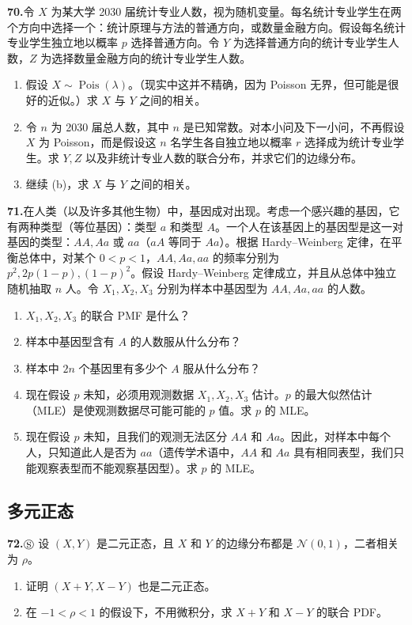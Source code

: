 \documentclass[UTF8, 12pt, fontset=fandol, oneside]{ctexart}
\begin{document}
\noindent\textbf{70.}\quad 令 $X$ 为某大学 2030 届统计专业人数，视为随机变量。每名统计专业学生在两个方向中选择一个：统计原理与方法的普通方向，或数量金融方向。假设每名统计专业学生独立地以概率 $p$ 选择普通方向。令 $Y$ 为选择普通方向的统计专业学生人数，$Z$ 为选择数量金融方向的统计专业学生人数。
\begin{enumerate}
  \item[(a)] 假设 $X\sim \operatorname{Pois}(\lambda)$。（现实中这并不精确，因为 Poisson 无界，但可能是很好的近似。）求 $X$ 与 $Y$ 之间的相关。
  \item[(b)] 令 $n$ 为 2030 届总人数，其中 $n$ 是已知常数。对本小问及下一小问，不再假设 $X$ 为 Poisson，而是假设这 $n$ 名学生各自独立地以概率 $r$ 选择成为统计专业学生。求 $Y,Z$ 以及非统计专业人数的联合分布，并求它们的边缘分布。
  \item[(c)] 继续 (b)，求 $X$ 与 $Y$ 之间的相关。
\end{enumerate}

\noindent\textbf{71.}\quad 在人类（以及许多其他生物）中，基因成对出现。考虑一个感兴趣的基因，它有两种类型（等位基因）：类型 $a$ 和类型 $A$。一个人在该基因上的基因型是这一对基因的类型：$AA,Aa$ 或 $aa$（$aA$ 等同于 $Aa$）。根据 Hardy--Weinberg 定律，在平衡总体中，对某个 $0<p<1$，$AA,Aa,aa$ 的频率分别为 $p^2,2p(1-p),(1-p)^2$。假设 Hardy--Weinberg 定律成立，并且从总体中独立随机抽取 $n$ 人。令 $X_1,X_2,X_3$ 分别为样本中基因型为 $AA,Aa,aa$ 的人数。
\begin{enumerate}
  \item[(a)] $X_1,X_2,X_3$ 的联合 PMF 是什么？
  \item[(b)] 样本中基因型含有 $A$ 的人数服从什么分布？
  \item[(c)] 样本中 $2n$ 个基因里有多少个 $A$ 服从什么分布？
  \item[(d)] 现在假设 $p$ 未知，必须用观测数据 $X_1,X_2,X_3$ 估计。$p$ 的最大似然估计（MLE）是使观测数据尽可能可能的 $p$ 值。求 $p$ 的 MLE。
  \item[(e)] 现在假设 $p$ 未知，且我们的观测无法区分 $AA$ 和 $Aa$。因此，对样本中每个人，只知道此人是否为 $aa$（遗传学术语中，$AA$ 和 $Aa$ 具有相同表型，我们只能观察表型而不能观察基因型）。求 $p$ 的 MLE。
\end{enumerate}

\subsection*{多元正态}

\noindent\textbf{72.}\quad $\circledS$ 设 $(X,Y)$ 是二元正态，且 $X$ 和 $Y$ 的边缘分布都是 $\mathcal{N}(0,1)$，二者相关为 $\rho$。
\begin{enumerate}
  \item[(a)] 证明 $(X+Y,X-Y)$ 也是二元正态。
  \item[(b)] 在 $-1<\rho<1$ 的假设下，不用微积分，求 $X+Y$ 和 $X-Y$ 的联合 PDF。
\end{enumerate}
\end{document}
